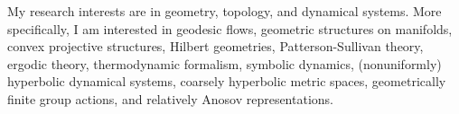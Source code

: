
\medskip

My research interests are in geometry, topology, and dynamical systems.
More specifically, I am interested in geodesic flows, geometric structures
on manifolds, convex projective structures, Hilbert geometries,
Patterson-Sullivan theory, ergodic theory, thermodynamic formalism,
symbolic dynamics, (nonuniformly) hyperbolic dynamical systems, coarsely
hyperbolic metric spaces, geometrically finite group actions, and
relatively Anosov representations.

